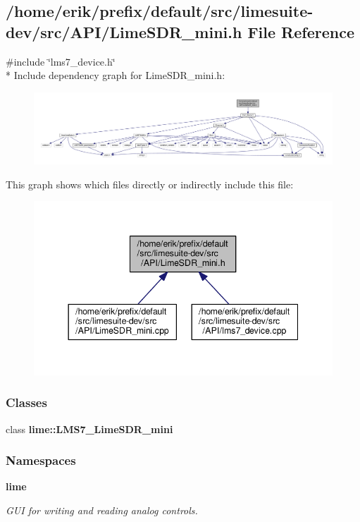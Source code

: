 \subsection{/home/erik/prefix/default/src/limesuite-\/dev/src/\+A\+P\+I/\+Lime\+S\+D\+R\+\_\+mini.h File Reference}
\label{LimeSDR__mini_8h}
{\ttfamily \#include \char`\"{}lms7\+\_\+device.\+h\char`\"{}}\\*
Include dependency graph for Lime\+S\+D\+R\+\_\+mini.\+h\+:
\nopagebreak
\begin{figure}[H]
\begin{center}
\leavevmode
\includegraphics[width=350pt]{de/dad/LimeSDR__mini_8h__incl}
\end{center}
\end{figure}
This graph shows which files directly or indirectly include this file\+:
\nopagebreak
\begin{figure}[H]
\begin{center}
\leavevmode
\includegraphics[width=344pt]{d7/dc6/LimeSDR__mini_8h__dep__incl}
\end{center}
\end{figure}
\subsubsection*{Classes}
\begin{DoxyCompactItemize}
\item 
class {\bf lime\+::\+L\+M\+S7\+\_\+\+Lime\+S\+D\+R\+\_\+mini}
\end{DoxyCompactItemize}
\subsubsection*{Namespaces}
\begin{DoxyCompactItemize}
\item 
 {\bf lime}
\begin{DoxyCompactList}\small\item\em G\+UI for writing and reading analog controls. \end{DoxyCompactList}\end{DoxyCompactItemize}
